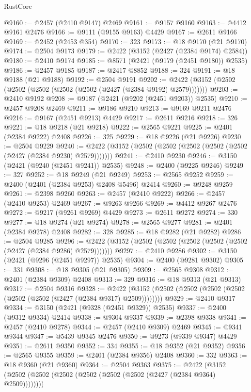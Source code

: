 \begin{lexlean}{RustCore}
\begin{coremodule}
@9160 := @2457 (@2410 @9147) @2469
@9161 := @9157 @9160
@9163 := @4412 @9161 @2476
@9166 := @9111 (@9155 @9163) @4429
@9167 := @2611 @9166
@9169 := @2452 (@2453 @354)
@9170 := 323
@9173 := @18 @9170 (@21 @9170)
@9174 := @2504 @9173
@9179 := @2422 (@3152 (@2427 (@2384 @9174) @2584))
@9180 := @2410 @9174
@9185 := @8571 (@2421 (@9179 (@2451 @9180)) @2535)
@9186 := @2457 @9185
@9187 := @2417 @8852
@9188 := 324
@9191 := @18 @9188 (@21 @9188)
@9192 := @2504 @9191
@9202 := @2422 (@3152 (@2502 (@2502 (@2502 (@2502 (@2502 (@2427 (@2384 @9192) @2579)))))))
@9203 := @2410 @9192
@9208 := @9187 (@2421 (@9202 (@2451 @9203)) @2535)
@9210 := @2457 @9208 @2469
@9211 := @9186 @9210
@9213 := @9169 @9211 @2476
@9216 := @9167 (@2451 @9213) @4429
@9217 := @2611 @9216
@9218 := 326
@9221 := @18 @9218 (@21 @9218)
@9222 := @2565 @9221
@9225 := @2401 (@2384 @9222) @2408
@9226 := 325
@9229 := @18 @9226 (@21 @9226)
@9230 := @2504 @9229
@9240 := @2422 (@3152 (@2502 (@2502 (@2502 (@2502 (@2502 (@2427 (@2384 @9230) @2579)))))))
@9241 := @2410 @9230
@9246 := @3150 (@2421 (@9240 (@2451 @9241)) @2535)
@9248 := @2400 (@9225 @9246)
@9249 := 327
@9252 := @18 @9249 (@21 @9249)
@9253 := @2565 @9252
@9259 := @2400 (@2401 (@2384 @9253) @2408 @5496) @2414
@9260 := @9248 @9259
@9261 := @2398 @9260
@9263 := @2457 (@2410 @9222)
@9266 := @2457 (@2410 @9253) @2469
@9267 := @9263 @9266
@9269 := @4412 @9267 @2476
@9272 := @9217 (@9261 @9269) @4429
@9273 := @2611 @9272
@9274 := 330
@9277 := @18 @9274 (@21 @9274)
@9278 := @2565 @9277
@9281 := @2401 (@2384 @9278) @2408
@9282 := 328
@9285 := @18 @9282 (@21 @9282)
@9286 := @2504 @9285
@9296 := @2422 (@3152 (@2502 (@2502 (@2502 (@2502 (@2502 (@2427 (@2384 @9286) @2579)))))))
@9297 := @2410 @9286
@9302 := @3150 (@2421 (@9296 (@2451 @9297)) @2535)
@9304 := @2400 (@9281 @9302)
@9305 := 331
@9308 := @18 @9305 (@21 @9305)
@9309 := @2565 @9308
@9312 := @2401 (@2384 @9309) @2408
@9313 := 329
@9316 := @18 @9313 (@21 @9313)
@9317 := @2504 @9316
@9328 := @2422 (@3152 (@2502 (@2502 (@2502 (@2502 (@2502 (@2502 (@2427 (@2384 @9317) @2509))))))))
@9329 := @2410 @9317
@9334 := @3150 (@2421 (@9328 (@2451 @9329)) @2535)
@9337 := @2400 (@9312 @9334) @2414
@9338 := @9304 @9337
@9339 := @2398 @9338
@9341 := @2457 (@2410 @9278)
@9344 := @2457 (@2410 @9309) @2469
@9345 := @9341 @9344
@9347 := @5439 @9345 @2476
@9350 := @9273 (@9339 @9347) @4429
@9351 := @2611 @9350
@9352 := 334
@9355 := @18 @9352 (@21 @9352)
@9356 := @2565 @9355
@9359 := @2401 (@2384 @9356) @2408
@9360 := 332
@9363 := @18 @9360 (@21 @9360)
@9364 := @2504 @9363
@9375 := @2422 (@3152 (@2502 (@2502 (@2502 (@2502 (@2502 (@2502 (@2427 (@2384 @9364) @2509))))))))

\end{coremodule}
\end{lexlean}
